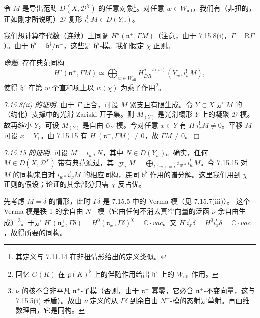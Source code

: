 令 $M$ 是导出范畴 $D(X,\mathcal{D}^{\chi})$ 的任意对象\footnote{其定义与 7.11.14 在非扭情形给出的定义类似。}。对任意 $w\in W_{\mathrm{aff}}$，我们有（非扭的，正如刚才所说明）$\mathcal{D}$-复形 $i_w^{!}M\in D(Y_w)$。

我们想计算李代数（连续）上同调 $H^{a}(\mathfrak{n}^{+},\Gamma M)$（注意，由于 7.15.8(i)，$\Gamma=\mathrm{R}\Gamma$）。由于 $\mathfrak{h}^{\flat}=\mathfrak{b}^{\dagger}/\mathfrak{n}^{+}$，这些是 $\mathfrak{h}^{\flat}$-模。我们假定 $\chi$ 正则。

 \emph{命题.} 存在典范同构
\[
H^{a}(\mathfrak{n}^{+},\Gamma M)\simeq\bigoplus_{w\in W_{\mathrm{aff}}}H^{a-l(w)}_{DR}(Y_w,i_w^{!}M),
\]
%
使得 $\mathfrak{h}^{\flat}$ 在第 $w$ 个直和项上以 $w(\chi)$ 为乘子作用\footnote{回忆 $G(K)$ 在 $\mathfrak{g}(K)^{\flat}$ 上的伴随作用给出 $\mathfrak{h}^{\flat}$ 上的 $W_{\mathrm{aff}}$-作用。}。

 \emph{7.15.8(ii) 的证明.} 由于 $\Gamma$ 正合，可设 $M$ 紧支且有限生成。令 $Y\subset X$ 是 $M$ 的（约化）支撑中的光滑 Zariski 开子集。则 $M_{(Y)}$ 是光滑概形 $Y$ 上的凝聚 $\mathcal{D}$-模。故再缩小 $Y$，可设 $M_{(Y)}$ 是自由 $\mathcal{O}_Y$-模。今对任意 $x\in Y$ 有 $H^{\cdot}i_x^{!}M\ne0$。平移 $M$ 可设 $x=Y_1$。由 7.15.15 有 $H^{\cdot}(\mathfrak{n}^{+},\Gamma M)\ne0$，故 $\Gamma M\ne0$。\hfill$\Box$

 \emph{7.15.15 的证明.} 可设 $M=i_{w*}N$，其中 $N\in D(Y_w)$。确实，任何 $M\in D(X,\mathcal{D}^{\chi})$ 带有典范滤过，其 $\operatorname{gr}_iM=\bigoplus_{l(w)=i}i_{w*}i_w^{!}M$。今 7.15.15 对 $M$ 的同构来自对 $i_{w*}i_w^{!}M$ 的相应同构，连同 $\mathfrak{h}^{\flat}$ 作用的谱分解。这里我们用到 $\chi$ 正则的假设；论证的其余部分只需 $\chi$ 反占优。

先考虑 $M=\delta$ 的情形，此时 $\Gamma\delta$ 是 7.15.5 中的 Verma 模（见 7.15.7(iii)）。%
这个 Verma 模是秩 1 的余自由 $N^{+}$-模（它由任何不消去真空向量的泛函 $\nu$ 余自由生成）\footnote{$\nu$ 的核不含非平凡 $\mathfrak{n}^{+}$-子模（否则，由于 $\mathfrak{n}^{+}$ 幂零，它必含 $\mathfrak{n}^{+}$-不变向量，这与 7.15.5(i) 矛盾）。故由 $\nu$ 定义的从 $\Gamma\delta$ 到余自由 $N^{+}$-模的态射是单射。再由维数理由，它是同构。}。于是 $H^{\cdot}(\mathfrak{n}^{+}_x,\Gamma\delta)=H^{0}(\mathfrak{n}^{+}_x,\Gamma\delta)^{\chi}=\mathbb{C}\cdot vac$。又 $H^{\cdot}i_x^{!}\delta=H^{0}i_x^{!}\delta=\mathbb{C}\cdot vac$，故得所要的同构。

